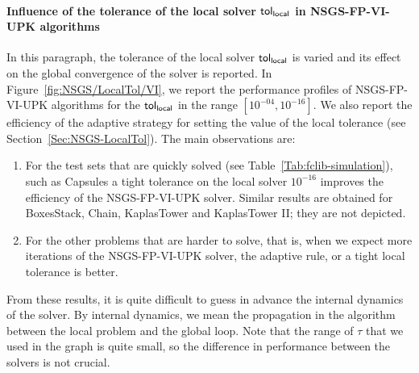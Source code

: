 \paragraph{Influence of the tolerance of the local solver $\sf tol_{local}$ in {\sf NSGS-FP-VI-UPK} algorithms}
In this paragraph, the tolerance of the local solver $\sf tol_{local}$  is varied and its effect on the global convergence of the solver is reported. In Figure~\ref{fig:NSGS/LocalTol/VI},  we report the performance profiles of {\sf NSGS-FP-VI-UPK} algorithms for the $\sf tol_{local}$ in the range $[10^{-04}, 10^{-16}]$. We also report the efficiency of the adaptive strategy for setting the value of the local tolerance (see Section~\ref{Sec:NSGS-LocalTol}). The main observations are:
\begin{enumerate}
\item For the test sets that are quickly solved (see Table~\ref{Tab:fclib-simulation}), such as   Capsules  a tight tolerance on the local solver $10^{-16}$ improves the efficiency  of the {\sf NSGS-FP-VI-UPK} solver. Similar results are obtained for BoxesStack, Chain, KaplasTower and KaplasTower II; they are not depicted. 
\item For the other problems that are harder to solve, that is, when we expect more iterations of the  {\sf NSGS-FP-VI-UPK} solver, the adaptive rule, or a tight local tolerance is better.
\end{enumerate}
From these results, it is quite difficult to guess in advance the internal dynamics of the solver. By internal dynamics, we mean the propagation in the algorithm between the local problem and the global loop. Note that the range of $\tau$ that we used in the graph is quite small, so the difference in performance between the solvers is not crucial.

